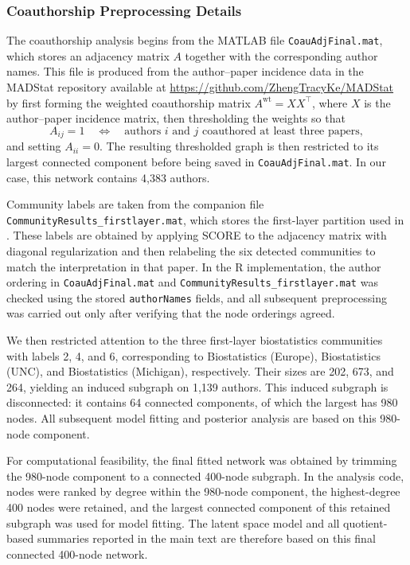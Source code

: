\documentclass[12pt]{article}
\begin{document}
\subsubsection*{Coauthorship Preprocessing Details}

The coauthorship analysis begins from the MATLAB file \texttt{CoauAdjFinal.mat}, which stores an
adjacency matrix $A$ together with the corresponding author names. This file is produced from the
author--paper incidence data in the MADStat repository available at \url{https://github.com/ZhengTracyKe/MADStat} by first forming the weighted coauthorship matrix
$A^{\mathrm{wt}} = XX^\top$, where $X$ is the author--paper incidence matrix, then thresholding the
weights so that
\[
A_{ij}=1 \quad\Longleftrightarrow\quad \text{authors } i \text{ and } j \text{ coauthored at least three papers},
\]
and setting $A_{ii}=0$. The resulting thresholded graph is then restricted to its largest connected
component before being saved in \texttt{CoauAdjFinal.mat}. In our case, this network contains
4{,}383 authors.

Community labels are taken from the companion file
\texttt{CommunityResults\_firstlayer.mat}, which stores the first-layer partition used in
\citet{ji_2022_CocitationCoauthorshipNetworks}. These labels are obtained by applying SCORE to the
adjacency matrix with diagonal regularization and then relabeling the six detected communities to
match the interpretation in that paper. In the R implementation, the author ordering in
\texttt{CoauAdjFinal.mat} and \texttt{CommunityResults\_firstlayer.mat} was checked using the
stored \texttt{authorNames} fields, and all subsequent preprocessing was carried out only after
verifying that the node orderings agreed.

We then restricted attention to the three first-layer biostatistics communities with labels
2, 4, and 6, corresponding to Biostatistics (Europe), Biostatistics (UNC), and Biostatistics
(Michigan), respectively. Their sizes are 202, 673, and 264, yielding an induced subgraph on
1{,}139 authors. This induced subgraph is disconnected: it contains 64 connected components, of
which the largest has 980 nodes. All subsequent model fitting and posterior analysis are based on
this 980-node component.

For computational feasibility, the final fitted network was obtained by trimming the 980-node
component to a connected 400-node subgraph. In the analysis code, nodes were ranked by degree
within the 980-node component, the highest-degree 400 nodes were retained, and the largest
connected component of this retained subgraph was used for model fitting. The latent space model and
all quotient-based summaries reported in the main text are therefore based on this final connected
400-node network.
\end{document}
